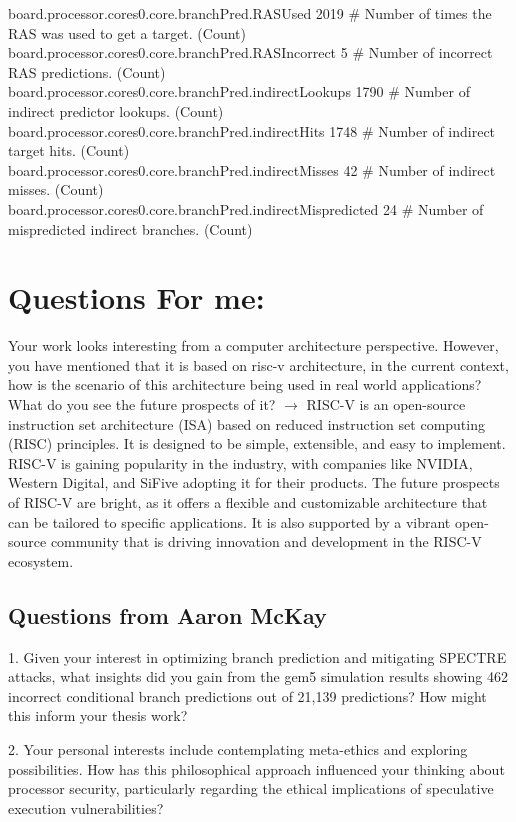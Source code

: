 board.processor.cores0.core.branchPred.RASUsed         2019 \# Number of times the RAS was used to get a target. (Count)\\
board.processor.cores0.core.branchPred.RASIncorrect     5 \# Number of incorrect RAS predictions. (Count)\\
board.processor.cores0.core.branchPred.indirectLookups  1790 \# Number of indirect predictor lookups. (Count)\\
board.processor.cores0.core.branchPred.indirectHits     1748 \# Number of indirect target hits. (Count)\\
board.processor.cores0.core.branchPred.indirectMisses    42 \# Number of indirect misses. (Count)\\
board.processor.cores0.core.branchPred.indirectMispredicted  24 \# Number of mispredicted indirect branches. (Count)\\

\section*{Questions For me: }
Your work looks interesting from a computer architecture perspective. However, you have mentioned that it is based on risc-v architecture, in the current context, how is the scenario of this architecture being used in real world applications? What do you see the future prospects of it?
$\longrightarrow$ RISC-V is an open-source instruction set architecture (ISA) based on reduced instruction set computing (RISC) principles. 
It is designed to be simple, extensible, and easy to implement. RISC-V is gaining popularity in the industry, with companies like NVIDIA, Western Digital, and SiFive adopting it for their products. 
The future prospects of RISC-V are bright, as it offers a flexible and customizable architecture that can be tailored to specific applications. 
It is also supported by a vibrant open-source community that is driving innovation and development in the RISC-V ecosystem.

\subsection{Questions from Aaron McKay}
1. Given your interest in optimizing branch prediction and mitigating SPECTRE attacks, what insights did you gain from the gem5 simulation results showing 462 incorrect conditional branch predictions out of 21,139 predictions? How might this inform your thesis work?

2. Your personal interests include contemplating meta-ethics and exploring possibilities. How has this philosophical approach influenced your thinking about processor security, particularly regarding the ethical implications of speculative execution vulnerabilities?